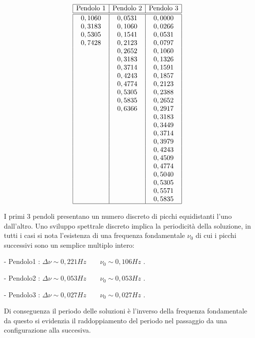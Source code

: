 \documentclass[13pt]{article}
\begin{document}
\begin{minipage}{.42\textwidth}
\begin{displaymath}
\begin{array}{|c|c|c|l}
\hline
\textrm{Pendolo 1} & \textrm{Pendolo 2}  & \textrm{Pendolo 3}  \\
\hline
\hline
 0,1060 & 0,0531 & 0,0000 \\
 0,3183 & 0,1060 & 0,0266 \\
 0,5305 & 0,1541 & 0,0531 \\
 0,7428 & 0,2123 & 0,0797 \\
   & 0,2652 & 0,1060 \\
   & 0,3183 & 0,1326 \\
   & 0,3714 & 0,1591 \\
   & 0,4243 & 0,1857 \\
   & 0,4774 & 0,2123 \\
   & 0,5305 & 0,2388 \\
   & 0,5835 & 0,2652 \\
   & 0,6366 & 0,2917 \\
   &   & 0,3183 \\
   &   & 0,3449 \\
   &   & 0,3714 \\
   &   & 0,3979 \\
   &   & 0,4243 \\
   &   & 0,4509 \\
   &   & 0,4774 \\
   &   & 0,5040 \\
   &   & 0,5305 \\
   &   & 0,5571 \\
   &   & 0,5835 \\
\hline
\end{array}
\end{displaymath}
\end{minipage}
\begin{minipage}{.60\textwidth}

I primi 3 pendoli presentano un numero discreto di picchi equidistanti l'uno dall'altro.
Uno sviluppo spettrale discreto implica la periodicità della soluzione, in tutti i casi si nota l'esistenza di una frequenza fondamentale $\nu_{0}$ di cui i picchi successivi sono un semplice multiplo intero:

 - Pendolo1 : $\Delta\nu \sim 0,221 Hz \qquad \nu_{0}\sim 0,106 Hz$ .

 - Pendolo2 : $\Delta\nu \sim 0,053 Hz  \qquad \nu_{0}\sim 0,053 Hz$ .

 - Pendolo3 : $\Delta\nu \sim 0,027 Hz  \qquad \nu_{0}\sim 0,027 Hz$ .

Di conseguenza il periodo delle soluzioni è l'inverso della frequenza fondamentale da questo si evidenzia il raddoppiamento del periodo nel passaggio da una configurazione alla succesiva.
\end{minipage}
\end{document}
